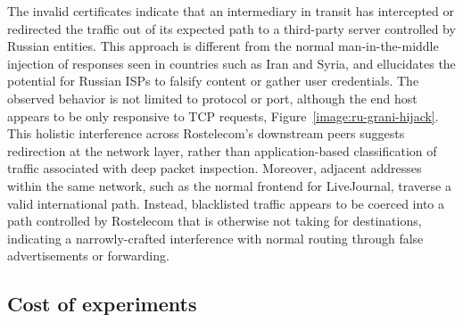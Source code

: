 The invalid certificates indicate that an intermediary in transit has
intercepted or redirected the traffic out of its expected path to a third-party
server controlled by Russian entities. This approach is different from the
normal man-in-the-middle injection of responses seen in countries such as Iran and Syria, and
ellucidates the potential for Russian ISPs to falsify content or gather user
credentials. The observed behavior is not limited to protocol or port, although the end
host appears to be only responsive to TCP requests,
Figure~\ref{image:ru-grani-hijack}. This holistic interference across Rostelecom's downstream peers suggests
redirection at the network layer, rather than application-based classification of traffic associated with deep packet inspection. Moreover,
adjacent addresses within the same network, such as the normal frontend for
LiveJournal, traverse a valid international path. Instead, blacklisted traffic
appears to be coerced into a path controlled by Rostelecom that is otherwise
not taking for destinations, indicating a narrowly-crafted interference with
normal routing through false advertisements or forwarding.

\subsection{Cost of experiments}
